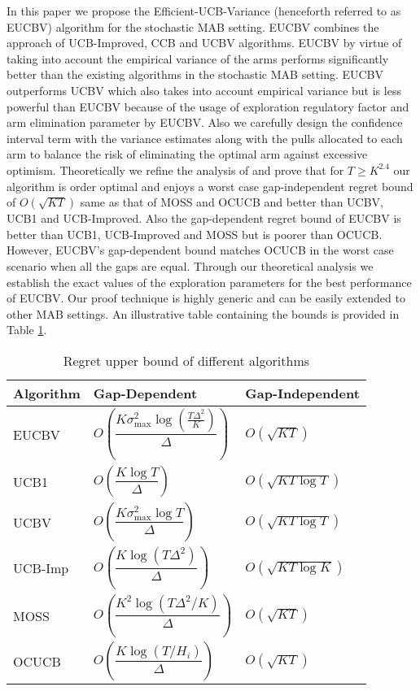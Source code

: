 In this paper we propose the Efficient-UCB-Variance (henceforth referred to as EUCBV) algorithm for the stochastic MAB setting. EUCBV combines the approach of UCB-Improved, CCB \citep{liu2016modification} and UCBV algorithms. EUCBV by virtue of taking into account the empirical variance of the arms performs significantly better than the existing algorithms in the stochastic MAB setting. EUCBV outperforms UCBV \citep{audibert2009exploration} which also takes into account empirical variance but is less powerful than EUCBV because of the usage of exploration regulatory factor and arm elimination parameter by EUCBV. Also we carefully design the confidence interval term with the variance estimates along with the pulls allocated to each arm to balance the risk of eliminating the optimal arm against excessive optimism.   Theoretically we refine the analysis of \citet{auer2010ucb} and prove that for $T\geq K^{2.4}$ our algorithm is order optimal and enjoys a worst case gap-independent regret bound of $O\left( \sqrt{KT} \right)$ same as that of MOSS and OCUCB and better than UCBV, UCB1 and UCB-Improved. Also the gap-dependent regret bound of EUCBV is better than UCB1, UCB-Improved and MOSS but is poorer than OCUCB. However, EUCBV's gap-dependent bound matches OCUCB in the worst case scenario when all the gaps are equal. Through our theoretical analysis we establish the exact values of the exploration parameters for the best performance of EUCBV. Our proof technique is highly generic and can be easily extended to other MAB settings. An illustrative table containing the bounds is provided in Table \ref{tab:comp-bds}. 


\begin{table}[t]
\caption{Regret upper bound of different algorithms}
\label{tab:comp-bds}
\begin{center}
\begin{tabular}{p{3em}p{9em}p{7em}}
\toprule
Algorithm  & Gap-Dependent & Gap-Independent \\
\hline
EUCBV		& $O\left( \dfrac{K\sigma_{\max}^{2}\log (\frac{T\Delta^2}{K})}{\Delta}\right)$ & $O\left(\sqrt{KT}\right)$\\
UCB1        & $O\left( \dfrac{K\log T}{\Delta} \right)$ & $O\left(\sqrt{KT\log T}\right)$ \\%
UCBV        & $O\left( \dfrac{K\sigma_{\max}^{2}\log T}{\Delta} \right)$ & $O\left(\sqrt{KT\log T}\right)$ \\
UCB-Imp 		& $O\left( \dfrac{K\log (T\Delta^2)}{\Delta} \right)$ & $O\left(\sqrt{KT\log K}\right)$ \\%
MOSS	     	& $O\left( \dfrac{K^2\log (T\Delta^2 /K)}{\Delta}\right)$ & $O\left(\sqrt{KT}\right)$\\%
OCUCB     	& $O\left( \dfrac{K\log (T/ H_{i})}{\Delta}\right)$ & $O\left(\sqrt{KT}\right)$\\\midrule
\end{tabular}
\end{center}
\vspace*{-2em}
\end{table}


